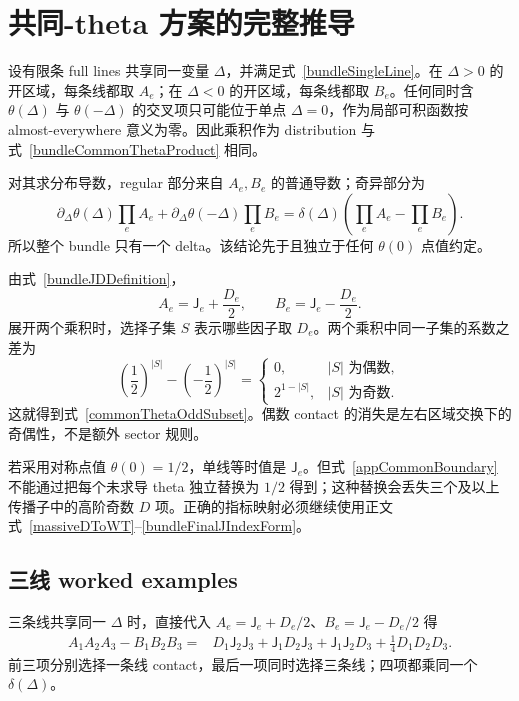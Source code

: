 ﻿\documentclass[a4paper,11pt]{article}
\begin{document}
\section{共同-theta 方案的完整推导}
\label{app:commonThetaDerivation}

设有限条 full lines 共享同一变量 $\Delta$，并满足式~\eqref{bundleSingleLine}。在 $\Delta>0$ 的开区域，每条线都取 $A_e$；在 $\Delta<0$ 的开区域，每条线都取 $B_e$。任何同时含 $\theta(\Delta)$ 与 $\theta(-\Delta)$ 的交叉项只可能位于单点 $\Delta=0$，作为局部可积函数按 almost-everywhere 意义为零。因此乘积作为 distribution 与式~\eqref{bundleCommonThetaProduct} 相同。

对其求分布导数，regular 部分来自 $A_e,B_e$ 的普通导数；奇异部分为
\begin{equation}
 \partial_\Delta\theta(\Delta)\prod_eA_e
 +\partial_\Delta\theta(-\Delta)\prod_eB_e
 =\delta(\Delta)\left(\prod_eA_e-\prod_eB_e\right).
 \label{appCommonBoundary}
\end{equation}
所以整个 bundle 只有一个 delta。该结论先于且独立于任何 $\theta(0)$ 点值约定。

由式~\eqref{bundleJDDefinition}，
\begin{equation}
 A_e=\mathsf J_e+\frac{D_e}{2},
 \qquad
 B_e=\mathsf J_e-\frac{D_e}{2}.
\end{equation}
展开两个乘积时，选择子集 $S$ 表示哪些因子取 $D_e$。两个乘积中同一子集的系数之差为
\begin{equation}
 \left(\frac12\right)^{|S|}
 -\left(-\frac12\right)^{|S|}
 =
 \begin{cases}
 0,&|S|\text{ 为偶数},\\
 2^{1-|S|},&|S|\text{ 为奇数}.
 \end{cases}
\end{equation}
这就得到式~\eqref{commonThetaOddSubset}。偶数 contact 的消失是左右区域交换下的奇偶性，不是额外 sector 规则。

若采用对称点值 $\theta(0)=1/2$，单线等时值是 $\mathsf J_e$。但式~\eqref{appCommonBoundary} 不能通过把每个未求导 theta 独立替换为 $1/2$ 得到；这种替换会丢失三个及以上传播子中的高阶奇数 $D$ 项。正确的指标映射必须继续使用正文式~\eqref{massiveDToWT}--\eqref{bundleFinalJIndexForm}。

\subsection{三线 worked examples}

三条线共享同一 $\Delta$ 时，直接代入 $A_e=\mathsf J_e+D_e/2$、$B_e=\mathsf J_e-D_e/2$ 得
\begin{align}
 A_1A_2A_3-B_1B_2B_3
 ={}&D_1\mathsf J_2\mathsf J_3
 +\mathsf J_1D_2\mathsf J_3
 +\mathsf J_1\mathsf J_2D_3
 +\frac14D_1D_2D_3.
 \label{threeLineDirectExpansion}
\end{align}
前三项分别选择一条线 contact，最后一项同时选择三条线；四项都乘同一个 $\delta(\Delta)$。
\end{document}
